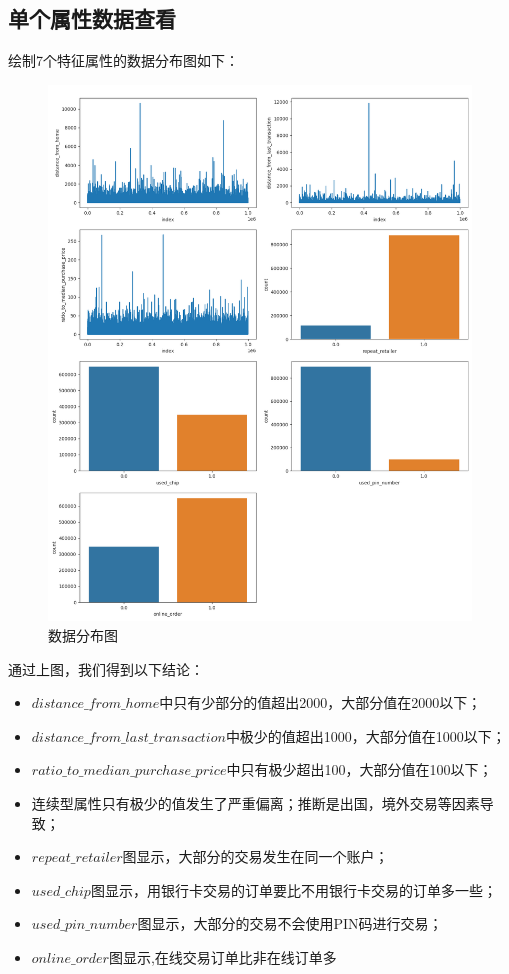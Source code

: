 \subsection{单个属性数据查看}
绘制7个特征属性的数据分布图如下：
\begin{figure}[H]
	\centering
	\includegraphics[scale=0.42,angle=0]{images/4.png}
	\caption{数据分布图}
	\label{4}
\end{figure}
通过上图，我们得到以下结论：
\begin{itemize}
	\item $distance\_from\_home$中只有少部分的值超出2000，大部分值在2000以下；
	\item $distance\_from\_last\_transaction$中极少的值超出1000，大部分值在1000以下；
	\item $ratio\_to\_median\_purchase\_price$中只有极少超出100，大部分值在100以下；
	\item 连续型属性只有极少的值发生了严重偏离；推断是出国，境外交易等因素导致；
	\item $repeat\_retailer$图显示，大部分的交易发生在同一个账户；
	\item $used\_chip$图显示，用银行卡交易的订单要比不用银行卡交易的订单多一些；
	\item $used\_pin\_number$图显示，大部分的交易不会使用PIN码进行交易；
	\item $online\_order$图显示,在线交易订单比非在线订单多
\end{itemize}
